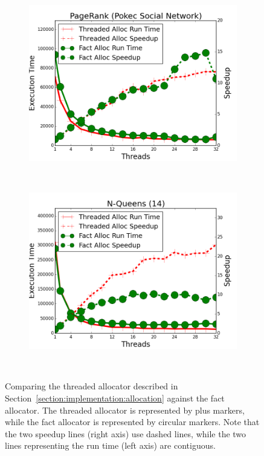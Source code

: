 \begin{figure}[h]
\begin{subfigure}[b]{\smallplotsize\textwidth}
                \includegraphics[width=\textwidth]{experiments/scalability/node-allocator-pagerank-pokec.png}
                \label{fig:implementation:node_pagerank}
        \end{subfigure}
        ~
        \begin{subfigure}[b]{\smallplotsize\textwidth}
                \includegraphics[width=\textwidth]{experiments/scalability/node-allocator-8queens-14.png}
                \label{fig:implementation:node_queens}
        \end{subfigure} \\
        \caption{Comparing the threaded allocator described in
        Section~\ref{section:implementation:allocation} against the fact
        allocator. The threaded allocator is represented by plus markers, while
        the fact allocator is represented by circular markers. Note that the two
        speedup lines (right axis) use dashed lines, while the two lines
        representing the run time (left axis) are contiguous.}

        \label{fig:implementation:node_results}
\end{figure}

